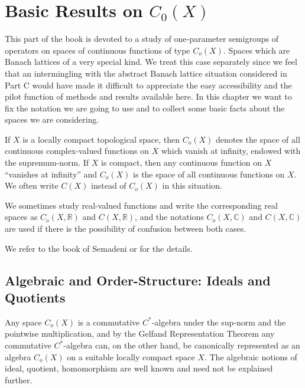 
\chapter{Basic Results on $C_{0}(X)$}\label{chap:B-I}


This part of the book is devoted to a study of one-parameter semigroups of operators on spaces of continuous functions of type $C_{o}(X)$.
Spaces which are Banach lattices of a very special kind.
We treat this case separately since we feel that an intermingling with the abstract Banach lattice situation considered in Part C would have made it difficult to appreciate the easy accessibility and the pilot function of methods and results available here.
In this chapter we want to fix the notation we are going to use and to collect some basic facts about the spaces we are considering.

If $X$ is a locally compact topological space, then $C_{o}(X)$ denotes the space of all continuous complex-valued functions on $X$ which vanish at infinity, endowed with the supremum-norm.
If $X$ is compact, then any continuous function on $X$ \enquote{vanishes at infinity} and $C_{o}(X)$ is the space of all continuous functions on $X$.
We often write $C(X)$ instead of $C_{o}(X)$ in this situation.

We sometimes study real-valued functions and write the corresponding real spaces as $C_{o}(X,\mathbb{R})$ and $C(X,\mathbb{R})$, and the notations $C_{o}(X,\mathbb{C})$ and $C(X,\mathbb{C})$ are used if there is the possibility of confusion between both cases.

We refer to the book of Semadeni \cite{semadeni:1971} or \cite{folland:1999} for the details.

\section{Algebraic and Order-Structure: Ideals and Quotients}\label{sec:b1-1}

Any space $C_{o}(X)$ is a commutative $C^{*}$-algebra under the sup-norm and the pointwise multiplication, and by the Gelfand Representation Theorem any commutative $C^{*}$-algebra can, on the other hand, be canonically represented as an algebra $C_{o}(X)$ on a suitable locally compact space $X$.
The algebraic notions of ideal, quotient, homomorphism are
well known and need not be explained further.

